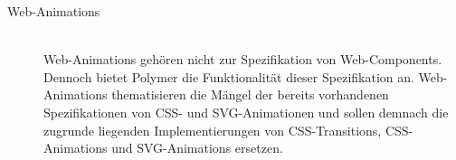 \begin{description}
\item[Web-Animations] \hfill \\
Web-Animations gehören nicht zur Spezifikation von Web-Components. Dennoch bietet Polymer die Funktionalität dieser Spezifikation an. Web-Animations thematisieren die Mängel der bereits vorhandenen Spezifikationen von CSS- und SVG-Animationen und sollen demnach die zugrunde liegenden Implementierungen von CSS-Transitions, CSS-Animations und SVG-Animations ersetzen.


\end{description}


